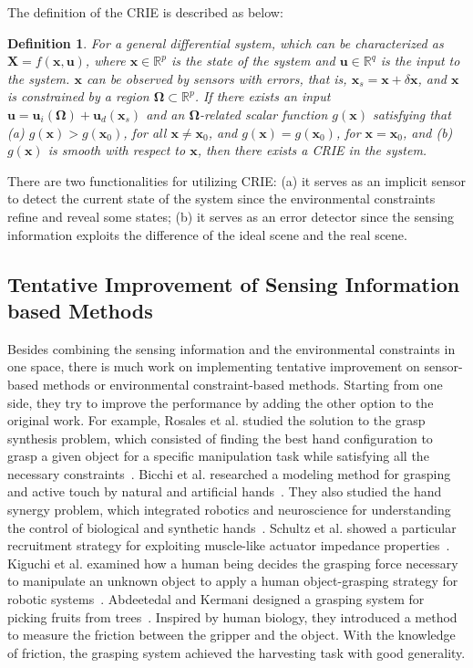 \documentclass[journal,twoside,web]{ieeecolor}
\newtheorem{definition}{\bf Definition}
\begin{document}
The definition of the CRIE is described as below:
\begin{definition}
    For a general differential system, which can be characterized as $ \mathbf{X}=f(\mathbf{x}, \mathbf{u}) $, where $ \mathbf{x} \in \mathbb{R}^{p} $ is the state of the system and $ \mathbf{u} \in \mathbb{R}^{q} $ is the input to the system. $ \mathbf{x} $ can be observed by sensors with errors, that is, $ \mathbf{x}_{s}=\mathbf{x}+\delta\mathbf{x} $, and $ \mathbf{x} $ is constrained by a region $ \mathbf{\Omega} \subset \mathbb{R}^{p}$. If there exists an input $ \mathbf{u}=\mathbf{u}_{i}(\mathbf{\Omega})+\mathbf{u}_{d}(\mathbf{x}_{s}) $ and an $ \mathbf{\Omega} $-related scalar function $ g(\mathbf{x}) $ satisfying that
    (a) $ g(\mathbf{x}) > g(\mathbf{x}_{0}) $, for all $ \mathbf{x} \ne \mathbf{x}_{0} $, and $ g(\mathbf{x}) = g(\mathbf{x}_{0}) $, for $ \mathbf{x} = \mathbf{x}_{0} $, and
    (b) $ g(\mathbf{x}) $ is smooth with respect to $ \mathbf{x} $,
    then there exists a CRIE in the system.
\end{definition}

There are two functionalities for utilizing CRIE: 
(a) it serves as an implicit sensor to detect the current state of the system since the environmental constraints refine and reveal some states;
(b) it serves as an error detector since the sensing information exploits the difference of the ideal scene and the real scene.

\subsection{Tentative Improvement of Sensing Information based Methods}
\label{subsec:tentative}

Besides combining the sensing information and the environmental constraints in one space, there is much work on implementing tentative improvement on sensor-based methods or environmental constraint-based methods. Starting from one side, they try to improve the performance by adding the other option to the original work. 
For example, 
Rosales et al. studied the solution to the grasp synthesis problem, which consisted of finding the best hand configuration to grasp a given object for a specific manipulation task while satisfying all the necessary constraints~\cite{Rosales2012}.
Bicchi et al. researched a modeling method for grasping and active touch by natural and artificial hands~\cite{Bicchi2011}.
They also studied the hand synergy problem, which integrated robotics and neuroscience for understanding the control of biological and synthetic hands~\cite{Santello2016}.
Schultz et al. showed a particular recruitment strategy for exploiting muscle-like actuator impedance properties~\cite{Schultz2015}.
Kiguchi et al. examined how a human being decides the grasping force necessary to manipulate an unknown object to apply a human object-grasping strategy for robotic systems~\cite{Kiguchi2003}.
Abdeetedal and Kermani designed a grasping system for picking fruits from trees~\cite{Abdeetedal2018}. Inspired by human biology, they introduced a method to measure the friction between the gripper and the object. With the knowledge of friction, the grasping system achieved the harvesting task with good generality.
\end{document}
